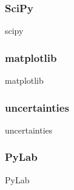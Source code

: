     \subsubsection{SciPy}
      \begin{frame}{scipy}
      \end{frame}

    \subsubsection{matplotlib}
      \begin{frame}{matplotlib}
      \end{frame}

    \subsubsection{uncertainties}
      \begin{frame}{uncertainties}
      \end{frame}

    \subsubsection{PyLab}
      \begin{frame}{PyLab}
      \end{frame}
